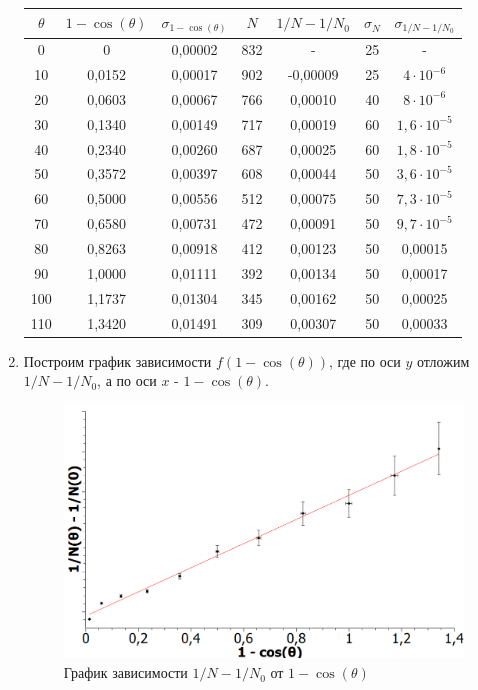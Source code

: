 \documentclass[a4paper, 12pt]{article}%
\begin{document}
\begin{enumerate}
\begin{center}
\begin{tabular}{|c|c|c|c|c|c|c|}
\hline 
$\theta$ & $1 - \cos (\theta )$ & $\sigma_{1 - \cos (\theta )}$ & $N$ & $1/N - 1/N_0$ & $\sigma_N$ & $\sigma_{1/N - 1/N_0}$ \\ 
\hline 
0 & 0 & 0,00002 & 832 & - & 25 & - \\ 
\hline 
10 & 0,0152 & 0,00017 & 902 & -0,00009 & 25 & $4\cdot 10^{-6}$ \\ 
\hline 
20 & 0,0603 & 0,00067 & 766 & 0,00010 & 40 & $8\cdot 10^{-6}$ \\ 
\hline 
30 & 0,1340 & 0,00149 & 717 & 0,00019 & 60 & $1,6\cdot 10^{-5}$ \\ 
\hline 
40 & 0,2340 & 0,00260 & 687 & 0,00025 & 60 & $1,8\cdot 10^{-5}$ \\ 
\hline 
50 & 0,3572 & 0,00397 & 608 & 0,00044 & 50 & $3,6\cdot 10^{-5}$ \\ 
\hline 
60 & 0,5000 & 0,00556 & 512 & 0,00075 & 50 & $7,3\cdot 10^{-5}$ \\ 
\hline 
70 & 0,6580 & 0,00731 & 472 & 0,00091 & 50 & $9,7\cdot 10^{-5}$ \\ 
\hline 
80 & 0,8263 & 0,00918 & 412 & 0,00123 & 50 &0,00015 \\ 
\hline 
90 & 1,0000 & 0,01111 & 392 & 0,00134 & 50 & 0,00017 \\ 
\hline 
100 & 1,1737 & 0,01304 & 345 & 0,00162 & 50 & 0,00025 \\ 
\hline 
110 & 1,3420 & 0,01491 & 309 & 0,00307 & 50 & 0,00033 \\ 
\hline 
\end{tabular} 
\end{center}

\item Построим график зависимости $f(1 - \cos (\theta ))$, где по оси $y$ отложим $1/N - 1/N_0$, а по оси $x$ - $1 - \cos (\theta )$.

\begin{figure}[h!]
\centering
\includegraphics[width = 0.9\linewidth]{images/graph.png}
\caption{График зависимости $1/N - 1/N_0$ от $1 - \cos (\theta )$}
\label{graph}
\end{figure}


\end{enumerate}
\end{document}
